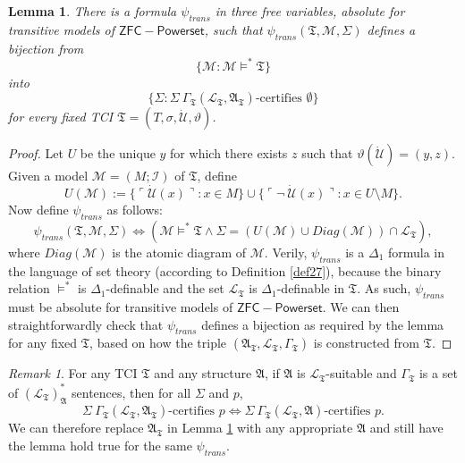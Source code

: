 \documentclass[12pt, twoside]{memoir}
\numberwithin{equation}{section}
\newtheorem{lem}[thm]{Lemma}
\theoremstyle{definition}
\theoremstyle{remark}
\newtheorem{rem}[thm]{Remark}
\theoremstyle{definition}
\theoremstyle{definition}
\theoremstyle{definition}
\theoremstyle{remark}
\begin{document}
\begin{lem}\label{mcequiv2}
There is a formula $\psi_{trans}$ in three free variables, absolute for transitive models of $\mathsf{ZFC - Powerset}$, such that $\psi_{trans}(\mathfrak{T}, \mathcal{M}, \Sigma)$ defines a bijection from $$\{\mathcal{M} : \mathcal{M} \models^* \mathfrak{T}\}$$ into $$\{\Sigma : \Sigma \ \Gamma_{\mathfrak{T}} (\mathcal{L}_{\mathfrak{T}}, \mathfrak{A}_{\mathfrak{T}})\text{-certifies } \emptyset\}$$ for every fixed TCI $\mathfrak{T} = (T, \sigma, \dot{\mathcal{U}}, \vartheta)$.
\end{lem}

\begin{proof}
Let $U$ be the unique $y$ for which there exists $z$ such that $\vartheta(\dot{\mathcal{U}}) = (y, z)$. Given a model $\mathcal{M} = (M; \mathcal{I})$ of $\mathfrak{T}$, define $$U(\mathcal{M}) := \{\ulcorner \dot{\mathcal{U}}(x) \urcorner : x \in M\} \cup \{\ulcorner \neg \ \dot{\mathcal{U}}(x) \urcorner : x \in U \setminus M\}.$$ Now define $\psi_{trans}$ as follows: $$\psi_{trans}(\mathfrak{T}, \mathcal{M}, \Sigma) \iff (\mathcal{M} \models^* \mathfrak{T} \wedge \Sigma = (U(\mathcal{M}) \cup Diag(\mathcal{M})) \cap \mathcal{L}_{\mathfrak{T}}),$$ where $Diag(\mathcal{M})$ is the atomic diagram of $\mathcal{M}$. Verily, $\psi_{trans}$ is a $\Delta_1$ formula in the language of set theory (according to Definition \ref{def27}), because the binary relation $\models^*$ is $\Delta_1$-definable and the set $\mathcal{L}_{\mathfrak{T}}$ is $\Delta_1$-definable in $\mathfrak{T}$. As such, $\psi_{trans}$ must be absolute for transitive models of $\mathsf{ZFC - Powerset}$. We can then straightforwardly check that $\psi_{trans}$ defines a bijection as required by the lemma for any fixed $\mathfrak{T}$, based on how the triple $(\mathfrak{A}_{\mathfrak{T}}, \mathcal{L}_{\mathfrak{T}}, \Gamma_{\mathfrak{T}})$ is constructed from $\mathfrak{T}$. 
\end{proof}

\begin{rem}\label{swapA}
For any TCI $\mathfrak{T}$ and any structure $\mathfrak{A}$, if $\mathfrak{A}$ is $\mathcal{L}_{\mathfrak{T}}$-suitable and $\Gamma_{\mathfrak{T}}$ is a set of $(\mathcal{L}_{\mathfrak{T}})^*_{\mathfrak{A}}$ sentences, then for all $\Sigma$ and $p$, $$\Sigma \ \Gamma_{\mathfrak{T}} (\mathcal{L}_{\mathfrak{T}}, \mathfrak{A}_{\mathfrak{T}})\text{-certifies } p \iff \Sigma \ \Gamma_{\mathfrak{T}} (\mathcal{L}_{\mathfrak{T}}, \mathfrak{A})\text{-certifies } p.$$ We can therefore replace $\mathfrak{A}_{\mathfrak{T}}$ in Lemma \ref{mcequiv2} with any appropriate $\mathfrak{A}$ and still have the lemma hold true for the same $\psi_{trans}$.
\end{rem}
\end{document}
